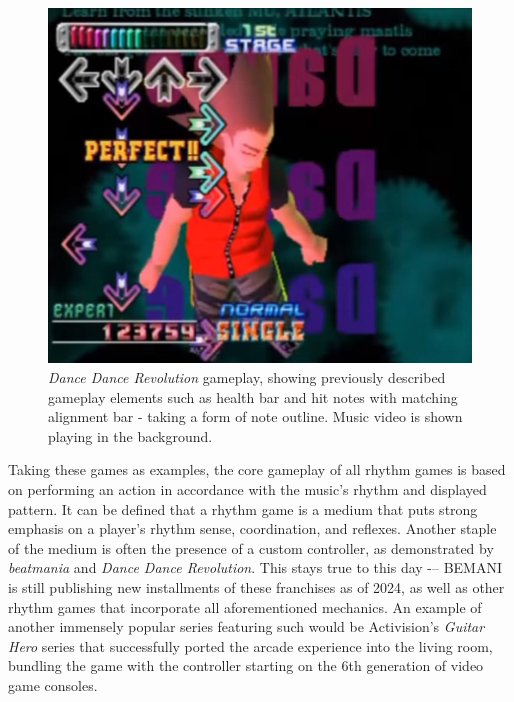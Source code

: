 \begin{figure}[h]
    \centering\includegraphics[scale=0.271]{obrazki/ddrgameplay.jpg}
    \caption{\textit{Dance Dance Revolution} gameplay, showing previously described gameplay elements such as health bar and hit notes with matching alignment bar - taking a form of note outline. Music video is shown playing in the background. \cite{ddrgameplay}}
    \label{fig:ddr_gameplay}
\end{figure}
\pagebreak

Taking these games as examples, the core gameplay of all rhythm games is based on performing an action in accordance with the music's rhythm and displayed pattern. It can be defined that a rhythm game is a medium that puts strong emphasis on a player's rhythm sense, coordination, and reflexes. Another staple of the medium is often the presence of a custom controller, as demonstrated by \textit{beatmania} and \textit{Dance Dance Revolution}. This stays true to this day -– BEMANI is still publishing new installments of these franchises as of 2024, as well as other rhythm games that incorporate all aforementioned mechanics. An example of another immensely popular series featuring such would be Activision's \textit{Guitar Hero} series that successfully ported the arcade experience into the living room, bundling the game with the controller starting on the 6th generation of video game consoles.

